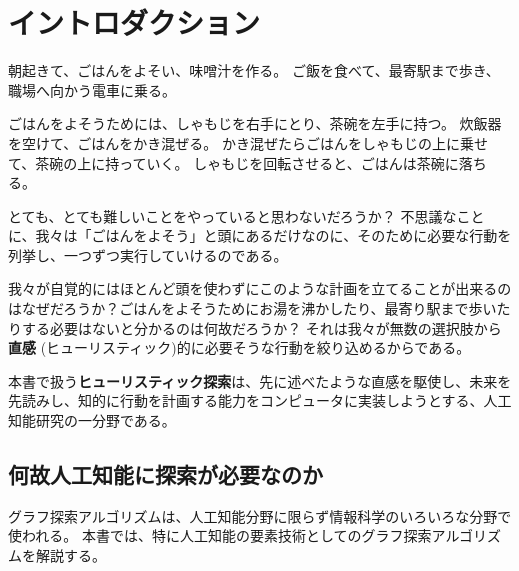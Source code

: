 \chapter{イントロダクション}
\label{ch:introduction}

朝起きて、ごはんをよそい、味噌汁を作る。
ご飯を食べて、最寄駅まで歩き、職場へ向かう電車に乗る。

ごはんをよそうためには、しゃもじを右手にとり、茶碗を左手に持つ。
炊飯器を空けて、ごはんをかき混ぜる。
かき混ぜたらごはんをしゃもじの上に乗せて、茶碗の上に持っていく。
しゃもじを回転させると、ごはんは茶碗に落ちる。

とても、とても難しいことをやっていると思わないだろうか？
不思議なことに、我々は「ごはんをよそう」と頭にあるだけなのに、そのために必要な行動を列挙し、一つずつ実行していけるのである。

我々が自覚的にはほとんど頭を使わずにこのような計画を立てることが出来るのはなぜだろうか？ごはんをよそうためにお湯を沸かしたり、最寄り駅まで歩いたりする必要はないと分かるのは何故だろうか？
それは我々が無数の選択肢から{\bf 直感} (ヒューリスティック)的に必要そうな行動を絞り込めるからである。

本書で扱う{\bf ヒューリスティック探索}は、先に述べたような直感を駆使し、未来を先読みし、知的に行動を計画する能力をコンピュータに実装しようとする、人工知能研究の一分野である。




\section{何故人工知能に探索が必要なのか}
\label{sec:why-search}

グラフ探索アルゴリズムは、人工知能分野に限らず情報科学のいろいろな分野で使われる。
本書では、特に人工知能の要素技術としてのグラフ探索アルゴリズムを解説する。

